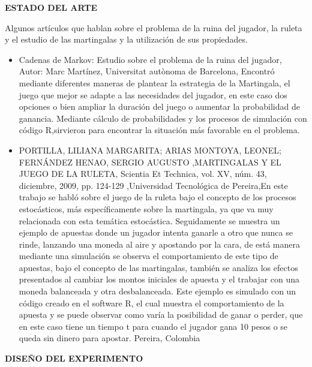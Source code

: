 \documentclass[letterpaper, 10 pt, conference]{ieeeconf}  %
\begin{document}
     
\begin{center}
    \bf{ESTADO DEL ARTE}
\end{center}
Algunos artículos que hablan sobre el problema de la ruina del jugador, la ruleta  y el estudio de las martingalas y la utilización de sus propiedades.
\begin{itemize}
    \item Cadenas de Markov: Estudio sobre el problema de la ruina del jugador, Autor: Marc Martínez, Universitat autònoma de Barcelona, Encontró mediante diferentes
maneras de plantear la estrategia de
la Martingala, el juego que mejor se adapte
a las necesidades del jugador, en este
caso  dos opciones o bien ampliar
la duración del juego o aumentar la probabilidad
de ganancia. Mediante cálculo de probabilidades
y los procesos de simulación con
código R,sirvieron para encontrar
la situación más favorable en el problema.
 \item PORTILLA, LILIANA MARGARITA; ARIAS MONTOYA, LEONEL; FERNÁNDEZ HENAO, SERGIO
AUGUSTO
,MARTINGALAS Y EL JUEGO DE LA RULETA,
Scientia Et Technica, vol. XV, núm. 43, diciembre, 2009, pp. 124-129
,Universidad Tecnológica de Pereira,En este trabajo se habló sobre el juego de la ruleta bajo el concepto de los
procesos estocásticos, más específicamente sobre la martingala, ya que va muy
relacionada con esta temática estocástica. Seguidamente se muestra un ejemplo
de apuestas donde un jugador intenta ganarle a otro que nunca se rinde, lanzando
una moneda al aire y apostando por la cara, de está manera mediante una
simulación se observa el comportamiento de este tipo de apuestas, bajo el
concepto de las martingalas, también se analiza los efectos presentados al
cambiar los montos iniciales de apuesta y el trabajar con una moneda balanceada
y otra desbalanceada. Este ejemplo es simulado con un código creado en el
software R, el cual muestra el comportamiento de la apuesta y se puede observar
como varía la posibilidad de ganar o perder, que en este caso tiene un tiempo t
para cuando el jugador gana 10 pesos o se queda sin dinero para apostar.
Pereira, Colombia
\end{itemize}

\begin{center}
   \textbf{DISEÑO DEL EXPERIMENTO}
\end{center}
\end{document}
